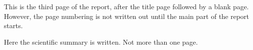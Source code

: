 \documentclass[../main.tex]{subfiles}
\begin{document}
This is the third page of the report, after the title page followed by a blank page. However, the page numbering is not written out until the main part of the report starts. 

Here the scientific summary is written. Not more than one page.
\end{document}
